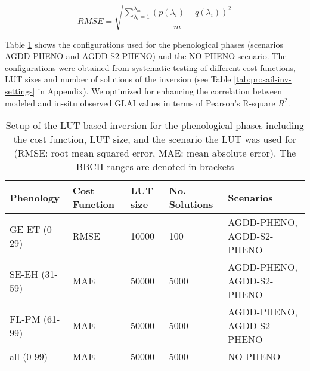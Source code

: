 \begin{equation}
    RMSE = \sqrt{\frac{\sum_{\lambda_i = 1}^{\lambda_m}(p(\lambda_i) - q(\lambda_i))^2}{m}}
\end{equation}

Table \ref{tab:inv-setup} shows the configurations used for the phenological phases (scenarios AGDD-PHENO and AGDD-S2-PHENO) and the NO-PHENO scenario. The configurations were obtained from systematic testing of different cost functions, \gls{LUT} sizes and number of solutions of the inversion (see Table \ref{tab:prosail-inv-settings} in Appendix). We optimized for enhancing the correlation between modeled and in-situ observed \gls{GLAI} values in terms of Pearson's R-square $R^2$.

\begin{table}[H]
\caption{Setup of the LUT-based inversion for the phenological phases including the cost function, \gls{LUT} size, and the scenario the \gls{LUT} was used for (RMSE: root mean squared error, MAE: mean absolute error). The BBCH ranges are denoted in brackets}
\label{tab:inv-setup}
\begin{tabularx}{\textwidth}{p{4cm}p{1.8cm}p{1.8cm}p{1.8cm}p{2.8cm}}
\toprule
\textbf{Phenology} & \textbf{Cost Function} & \textbf{LUT size} & \textbf{No. Solutions}  & \textbf{Scenarios}\\ \midrule
GE-ET (0-29)                 & RMSE          & 10000              & 100        & AGDD-PHENO, AGDD-S2-PHENO         \\
SE-EH (31-59)                & MAE           & 50000              & 5000   & AGDD-PHENO, AGDD-S2-PHENO             \\
FL-PM (61-99)                & MAE           & 50000              & 5000    & AGDD-PHENO, AGDD-S2-PHENO            \\
all (0-99)                 & MAE           & 50000              & 5000     & NO-PHENO           \\ \bottomrule
\end{tabularx}
\end{table}

